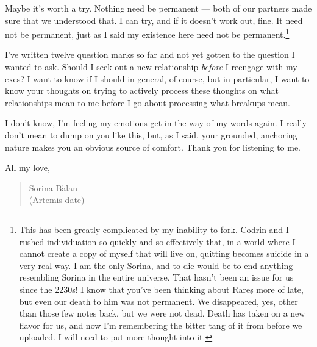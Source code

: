 Maybe it's worth a try. Nothing need be permanent — both of our partners made sure that we understood that. I can try, and if it doesn't work out, fine. It need not be permanent, just as I said my existence here need not be permanent.\footnote{This has been greatly complicated by my inability to fork. Codrin and I rushed individuation so quickly and so effectively that, in a world where I cannot create a copy of myself that will live on, quitting becomes suicide in a very real way. I am the only Sorina, and to die would be to end anything resembling Sorina in the entire universe. That hasn't been an issue for us since the 2230s! I know that you've been thinking about Rareș more of late, but even our death to him was not permanent. We disappeared, yes, other than those few notes back, but we were not dead. Death has taken on a new flavor for us, and now I'm remembering the bitter tang of it from before we uploaded. I will need to put more thought into it.}

I've written twelve question marks so far and not yet gotten to the question I wanted to ask. Should I seek out a new relationship \emph{before} I reengage with my exes? I want to know if I should in general, of course, but in particular, I want to know your thoughts on trying to actively process these thoughts on what relationships mean to me before I go about processing what breakups mean.

I don't know, I'm feeling my emotions get in the way of my words again. I really don't mean to dump on you like this, but, as I said, your grounded, anchoring nature makes you an obvious source of comfort. Thank you for listening to me.

All my love,

\begin{quote}
Sorina Bălan\\
(Artemis date)
\end{quote}
